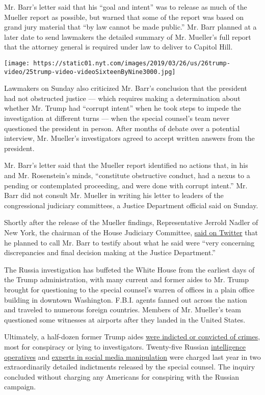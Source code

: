 Mr. Barr's letter said that his ``goal and intent'' was to release as
much of the Mueller report as possible, but warned that some of the
report was based on grand jury material that ``by law cannot be made
public.'' Mr. Barr planned at a later date to send lawmakers the
detailed summary of Mr. Mueller's full report that the attorney general
is required under law to deliver to Capitol Hill.

\texttt{[image: https://static01.nyt.com/images/2019/03/26/us/26trump-video/25trump-video-videoSixteenByNine3000.jpg]}

Lawmakers on Sunday also criticized Mr. Barr's conclusion that the
president had not obstructed justice --- which requires making a
determination about whether Mr. Trump had ``corrupt intent'' when he
took steps to impede the investigation at different turns --- when the
special counsel's team never questioned the president in person. After
months of debate over a potential interview, Mr. Mueller's investigators
agreed to accept written answers from the president.

Mr. Barr's letter said that the Mueller report identified no actions
that, in his and Mr. Rosenstein's minds, ``constitute obstructive
conduct, had a nexus to a pending or contemplated proceeding, and were
done with corrupt intent.'' Mr. Barr did not consult Mr. Mueller in
writing his letter to leaders of the congressional judiciary committees,
a Justice Department official said on Sunday.

Shortly after the release of the Mueller findings, Representative
Jerrold Nadler of New York, the chairman of the House Judiciary
Committee,
\href{https://twitter.com/RepJerryNadler/status/1109913142933573632}{said
on Twitter} that he planned to call Mr. Barr to testify about what he
said were ``very concerning discrepancies and final decision making at
the Justice Department.''

The Russia investigation has buffeted the White House from the earliest
days of the Trump administration, with many current and former aides to
Mr. Trump brought for questioning to the special counsel's warren of
offices in a plain office building in downtown Washington. F.B.I. agents
fanned out across the nation and traveled to numerous foreign countries.
Members of Mr. Mueller's team questioned some witnesses at airports
after they landed in the United States.

Ultimately, a half-dozen former Trump aides
\href{https://www.nytimes.com/interactive/2018/08/21/us/mueller-trump-charges.html}{were
indicted or convicted of crimes}, most for conspiracy or lying to
investigators. Twenty-five Russian
\href{https://www.nytimes.com/2018/07/13/us/politics/mueller-indictment-russian-intelligence-hacking.html}{intelligence
operatives} and
\href{https://www.nytimes.com/2018/02/16/us/politics/russians-indicted-mueller-election-interference.html}{experts
in social media manipulation} were charged last year in two
extraordinarily detailed indictments released by the special counsel.
The inquiry concluded without charging any Americans for conspiring with
the Russian campaign.

